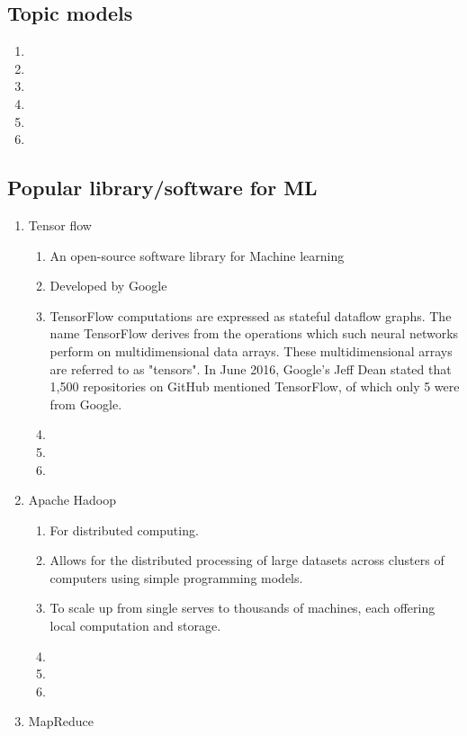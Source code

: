 \documentclass[12pt, landscape]{article}
\begin{document}
\begin{multicols}{2}
\subsection{Topic models}
\begin{enumerate}
\item 
\item
\item
\item
\item
\item
\end{enumerate}

\subsection{Popular library/software for ML}
\begin{enumerate}
	\item Tensor flow
	\begin{enumerate}
		\item An open-source software library for Machine learning
		\item Developed by Google
		\item TensorFlow computations are expressed as stateful dataflow graphs. The name TensorFlow derives from the operations which such neural networks perform on multidimensional data arrays. These multidimensional arrays are referred to as "tensors". In June 2016, Google's Jeff Dean stated that 1,500 repositories on GitHub mentioned TensorFlow, of which only 5 were from Google.
		\item 
		\item
		\item
	\end{enumerate}
	\item Apache Hadoop
	\begin{enumerate}
		\item For distributed computing. 
		\item Allows for the distributed processing of large datasets across clusters of computers using simple programming models. 
		\item To scale up from single serves to thousands of machines, each offering local computation and storage.
		\item
		\item
		\item
	\end{enumerate}
	\item MapReduce
	\begin{enumerate}

\end{enumerate}
\end{enumerate}
\end{multicols}
\end{document}
